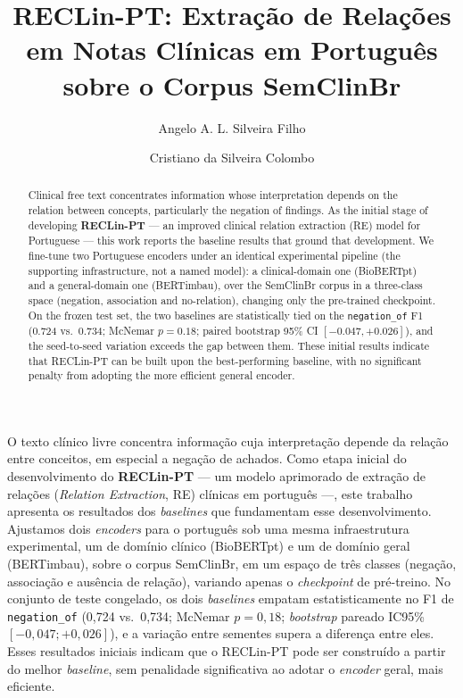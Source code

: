 \documentclass[12pt]{article}
\title{RECLin-PT: Extração de Relações em Notas Clínicas em Português sobre o
Corpus SemClinBr}
\author{Angelo A. L. Silveira Filho\inst{1} \and Cristiano da Silveira
Colombo\inst{1}}
\begin{document}
\maketitle

\begin{abstract}
Clinical free text concentrates information whose interpretation depends on the
relation between concepts, particularly the negation of findings. As the initial
stage of developing \textbf{RECLin-PT} --- an improved clinical relation
extraction (RE) model for Portuguese --- this work reports the baseline results
that ground that development. We fine-tune two Portuguese encoders under an
identical experimental pipeline (the supporting infrastructure, not a named
model): a clinical-domain one (BioBERTpt) and a general-domain one (BERTimbau),
over the SemClinBr corpus in a three-class space (negation, association and
no-relation), changing only the pre-trained checkpoint. On the frozen test set,
the two baselines are statistically tied on the \texttt{negation\_of} F1 (0.724
vs.\ 0.734; McNemar $p=0.18$; paired bootstrap 95\% CI $[-0.047,+0.026]$), and
the seed-to-seed variation exceeds the gap between them. These initial results
indicate that RECLin-PT can be built upon the best-performing baseline, with no
significant penalty from adopting the more efficient general encoder.
\end{abstract}

\begin{resumo}
O texto clínico livre concentra informação cuja interpretação depende da relação
entre conceitos, em especial a negação de achados. Como etapa inicial do
desenvolvimento do \textbf{RECLin-PT} --- um modelo aprimorado de extração de
relações (\emph{Relation Extraction}, RE) clínicas em português ---, este
trabalho apresenta os resultados dos \emph{baselines} que fundamentam esse
desenvolvimento. Ajustamos dois \emph{encoders} para o português sob uma mesma
infraestrutura experimental, um de domínio clínico (BioBERTpt) e um de domínio
geral (BERTimbau), sobre o corpus SemClinBr, em um espaço de três classes
(negação, associação e ausência de relação), variando apenas o \emph{checkpoint}
de pré-treino. No conjunto de teste congelado, os dois \emph{baselines} empatam
estatisticamente no F1 de \texttt{negation\_of} (0,724 vs.\ 0,734; McNemar
$p=0,18$; \emph{bootstrap} pareado IC95\% $[-0,047;+0,026]$), e a variação entre
sementes supera a diferença entre eles. Esses resultados iniciais indicam que o
RECLin-PT pode ser construído a partir do melhor \emph{baseline}, sem penalidade
significativa ao adotar o \emph{encoder} geral, mais eficiente.
\end{resumo}
\end{document}
